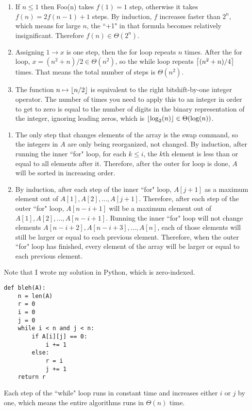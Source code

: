 \documentclass{article}
\begin{document}
\bigskip
\par
\begin{prob}
\end{prob}
\begin{enumerate}[label=(\alph*)]
    \item If $n \leq 1$ then Foo(n) takes $f(1)=1$ step, otherwise it takes $f(n)=2f(n-1)+1$ steps. By induction, $f$ increases faster than $2^n$, which means for large $n$, the ``+1" in that formula becomes relatively insignificant. Therefore $f(n) \in \Theta(2^n)$.
    \item Assigning $1 \rightarrow x$ is one step, then the for loop repeats $n$ times. After the for loop, $x = (n^2+n)/2 \in \Theta(n^2)$, so the while loop repeats $\left\lceil (n^2+n)/4 \right\rceil$ times. That means the total number of steps is $\Theta(n^2)$.
    \item The function $n \mapsto \left\lfloor n/2 \right\rfloor$ is equivalent to the right bitshift-by-one integer operator. The number of times you need to apply this to an integer in order to get to zero is equal to the number of digits in the binary representation of the integer, ignoring leading zeros, which is $\left\lfloor \log_2(n) \right\rfloor \in \Theta(\log(n))$.
\end{enumerate}

\bigskip
\par
\begin{prob}
\end{prob}
\begin{enumerate}[label=(\alph*)]
    \item The only step that changes elements of the array is the swap command, so the integers in $A$ are only being reorganized, not changed. By induction, after running the inner ``for" loop, for each $k \leq i$, the $k$th element is less than or equal to all elements after it. Therefore, after the outer for loop is done, $A$ will be sorted in increasing order.
    \item By induction, after each step of the inner ``for" loop, $A[j+1]$ as a maximum element out of $A[1], A[2], \dots, A[j+1]$. Therefore, after each step of the outer ``for" loop, $A[n-i+1]$ will be a maximum element out of $A[1], A[2], \dots, A[n-i+1]$. Running the inner ``for" loop will not change elements $A[n-i+2], A[n-i+3], \dots, A[n]$, each of those elements will still be larger or equal to each previous element. Therefore, when the outer ``for" loop has finished, every element of the array will be larger or equal to each previous element.
\end{enumerate}

\bigskip
\par
\begin{prob}
\end{prob}
Note that I wrote my solution in Python, which is zero-indexed.
\begin{verbatim}
def bleh(A):
    n = len(A)
    r = 0
    i = 0
    j = 0
    while i < n and j < n:
        if A[i][j] == 0:
            i += 1
        else:
            r = i
            j += 1
    return r
\end{verbatim}
Each step of the ``while" loop runs in constant time and increases either $i$ or $j$ by one, which means the entire algorithms runs in $\Theta(n)$ time.


\end{document}
